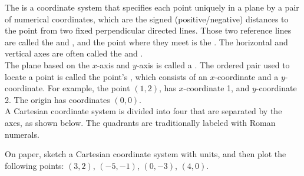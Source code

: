 \documentclass{ximera}
\begin{document}
\begin{definition}
The  is a coordinate system that specifies each point uniquely in a plane by a pair of numerical coordinates, which are the signed (positive/negative) distances to the point from two fixed perpendicular directed lines. Those two reference lines are called the  and , and the point where they meet is the . The horizontal and vertical axes are often called the  and .  \\

The plane based on the $x$-axis and $y$-axis is called a . The ordered pair used to locate a point is called the point's , which consists of an $x$-coordinate and a $y$-coordinate. For example, the point $(1,2)$, has $x$-coordinate 1,  and $y$-coordinate 2.   The origin has coordinates $(0,0)$. \\

A Cartesian coordinate system is divided into four  that are separated by the axes, as shown below. The quadrants are traditionally labeled with Roman numerals.

\begin{image}
\end{image}

\end{definition}


\begin{example}
On paper, sketch a Cartesian coordinate system with units, and then plot the following points: $(3,2)$, $(-5,-1)$, $(0,-3)$, $(4,0)$.

\begin{explanation} 

\begin{image}
\end{image}

\end{explanation}
\end{example}
\end{document}
